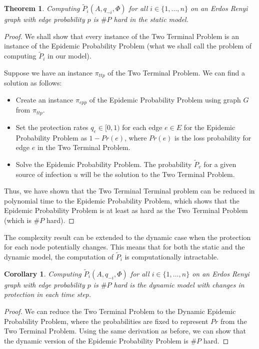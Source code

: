 \documentclass{article}
\theoremstyle{plain}
\newtheorem{theorem}{Theorem}
\newtheorem{corollary}{Corollary}
\begin{document}
\begin{theorem}
  Computing $\tilde{P}_i(A, q_{-i}, \Phi)$ for all $i \in \{1, \ldots, n\}$ on an Erdos Renyi graph with edge probability $p$ is $\# P$ hard in the static model.
\end{theorem}
\begin{proof}
  We shall show that every instance of the Two Terminal Problem is an instance of the Epidemic Probability Problem (what we shall call the problem of computing $\tilde{P}_i$ in our model).

  Suppose we have an instance $\pi_{ttp}$ of the Two Terminal Problem. We can find a solution as follows:
  \begin{itemize}
    \item Create an instance $\pi_{epp}$ of the Epidemic Probability Problem using graph $G$ from $\pi_{ttp}$.
    \item Set the protection rates $q_e \in [0,1)$ for each edge $e \in E$ for the Epidemic Probability Problem as $1 - Pr(e)$, where $Pr(e)$ is the loss probability for edge $e$ in the Two Terminal Problem.
    \item Solve the Epidemic Probability Problem. The probability $\tilde{P}_v$ for a given source of infection $u$ will be the solution to the Two Terminal Problem.
  \end{itemize}

  Thus, we have shown that the Two Terminal Terminal problem can be reduced in polynomial time to the Epidemic Probability Problem, which shows that the Epidemic Probability Problem is at least as hard as the Two Terminal Problem (which is $\# P$ hard).
\end{proof}

The complexity result can be extended to the dynamic case when the protection for each node potentially changes. This means that for both the static and the dynamic model, the computation of $\tilde{P}_i$ is computationally intractable.

\begin{corollary}
  Computing $\tilde{P}_i(A, q_{-i}, \Phi)$ for all $i \in \{1, \ldots, n\}$ on an Erdos Renyi graph with edge probability $p$ is $\# P$ hard is the dynamic model with changes in protection in each time step.
\end{corollary}
\begin{proof}
  We can reduce the Two Terminal Problem to the Dynamic Epidemic Probability Problem, where the probabilities are fixed to represent $Pr$ from the Two Terminal Problem. Using the same derivation as before, we can show that the dynamic version of the Epidemic Probability Problem is $\# P$ hard.
\end{proof}
\end{document}
